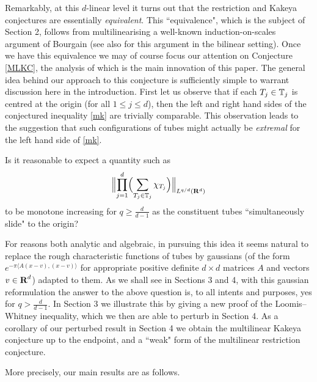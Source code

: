 Remarkably, at this $d$-linear level it turns out that the
restriction and Kakeya conjectures are essentially
\textit{equivalent}. This ``equivalence", which is the subject of
Section 2, follows from multilinearising a well-known
induction-on-scales argument of Bourgain \cite{Bo} (see also \cite{TVV}
for this argument in the bilinear setting). Once we have this
equivalence we may of course focus our attention on Conjecture
\ref{MLKC}, the analysis of which is the main innovation of this
paper. The general idea behind our approach to this conjecture is
sufficiently simple to warrant discussion here in the
introduction. First let us observe that if each $T_j\in{\mathbb{T}}_j$
is centred at the origin (for all $1\leq j\leq d$), then the
left and right hand sides of the conjectured
inequality \eqref{mk} are trivially comparable. This observation
leads to the suggestion that such
configurations of tubes might actually be \textit{extremal} for
the left hand side of \eqref{mk}.
\begin{question}
Is it reasonable to expect a quantity such as
$$
\Bigl\|\prod_{j=1}^{d}\Bigl(\sum_{T_{j}\in{\mathbb{T}}_{j}}\chi_{T_{j}}\Bigr)\Bigr\|_{L^{q/d}({\bf
R}^d)}$$
to be monotone increasing for $q\geq\tfrac{d}{d-1}$ as the
constituent tubes ``simultaneously slide" to the origin?
\end{question}
For reasons both analytic and algebraic, in pursuing this idea it
seems natural to replace the rough characteristic functions of
tubes by gaussians (of the form $e^{-\pi\langle
A(x-v),(x-v)\rangle}$ for appropriate positive definite $d\times
d$ matrices $A$ and vectors $v\in{\hbox{\bf R}}^d$) adapted to them. As we
shall see in Sections 3 and 4, with this gaussian reformulation
the answer to the above question is, to all intents and purposes,
yes for $q>\tfrac{d}{d-1}$.
In Section 3 we illustrate this by giving a new proof of the
Loomis--Whitney inequality, which we then are able to perturb in
Section 4.
As a corollary of our perturbed result in Section 4 we
obtain the multilinear Kakeya conjecture up to the endpoint, and a
``weak" form of the multilinear restriction conjecture.


More precisely, our main results are as follows.

